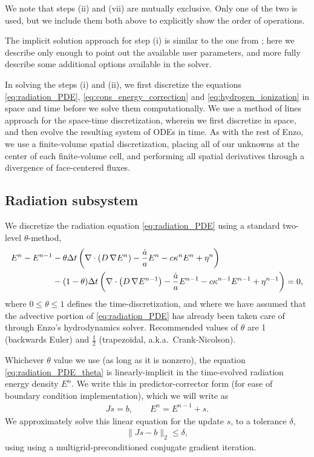 \documentclass[letterpaper,10pt]{article}
\renewcommand{\(}{\left(}
\renewcommand{\)}{\right)}
\newcommand{\dt}{\Delta t}
\begin{document}
We note that steps (ii) and (vii) are mutually exclusive.  Only one of
the two is used, but we include them both above to explicitly show the
order of operations.

The implicit solution approach for step (i) is similar to the one from 
\cite{ReynoldsHayesPaschosNorman2009}; here we describe only enough
to point out the available user parameters, and more fully describe
some additional options available in the solver.

In solving the steps (i) and (ii), we first discretize the
equations \eqref{eq:radiation_PDE}, \eqref{eq:cons_energy_correction}
and \eqref{eq:hydrogen_ionization} in space and time before we solve
them computationally.  We use a method of lines approach for the
space-time discretization, wherein we first discretize in space, and
then evolve the resulting system of ODEs in time.  As with the rest of
Enzo, we use a finite-volume spatial discretization, placing all of
our unknowns at the center of each finite-volume cell, and performing
all spatial derivatives through a divergence of face-centered fluxes.


\subsection{Radiation subsystem}
\label{sec:rad_solve}

We discretize the radiation equation \eqref{eq:radiation_PDE} using a
standard two-level $\theta$-method,
\begin{align}
  \label{eq:radiation_PDE_theta}
  E^n - E^{n-1} &- \theta\dt\left(\nabla\cdot\(D\,\nabla E^n\) - \frac{\dot{a}}{a} E^n -
    c\kappa^n E^n + \eta^n\right) \\ 
  \notag
  & - (1-\theta)\dt\left(\nabla\cdot\(D\,\nabla E^{n-1}\) - \frac{\dot{a}}{a} E^{n-1} -
    c\kappa^{n-1} E^{n-1} + \eta^{n-1}\right) = 0,
\end{align}
where $0\le\theta\le 1$ defines the time-discretization, and where we
have assumed that the advective portion of \eqref{eq:radiation_PDE}
has already been taken care of through Enzo's hydrodynamics solver.
Recommended values of $\theta$ are 1 (backwards Euler) and $\frac12$
(trapezoidal, a.k.a.~Crank-Nicolson).  

Whichever $\theta$ value we use (as long as it is nonzero), the
equation \eqref{eq:radiation_PDE_theta} is linearly-implicit in the
time-evolved radiation energy density $E^n$.  We write this in
predictor-corrector form (for ease of boundary condition
implementation), which we will write as
\begin{align}
\label{eq:linear_system}
  J s = b, \qquad E^n = E^{n-1} + s.
\end{align}
We approximately solve this linear equation for the update $s$,
to a tolerance $\delta$,
\begin{align}
\label{eq:linear_system_approx}
  \| J s - b \|_2 \le \delta,
\end{align}
using using a multigrid-preconditioned conjugate gradient iteration.
\end{document}
